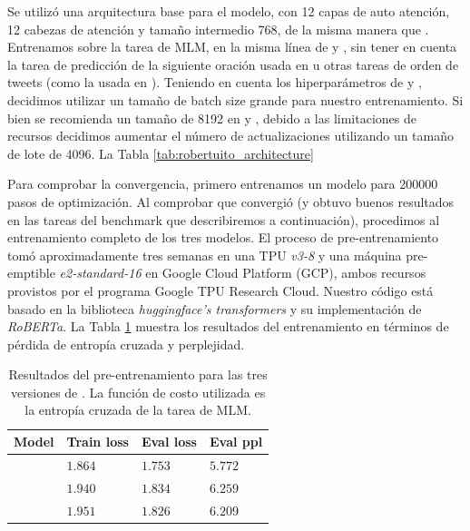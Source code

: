 Se utilizó una arquitectura \roberta{} base para el modelo, con 12 capas de auto atención, 12 cabezas de atención y tamaño intermedio 768, de la misma manera que \bertweet{}. Entrenamos \robertuito{} sobre la tarea de MLM, en la misma línea de \roberta{} y \bertweet{}, sin tener en cuenta la tarea de predicción de la siguiente oración usada en \bert{} u otras tareas de orden de tweets (como la usada en \citet{gonzalez2021twilbert}). Teniendo en cuenta los hiperparámetros de \roberta{} y \bertweet{}, decidimos utilizar un tamaño de batch size grande para nuestro entrenamiento. Si bien se recomienda un tamaño de \num{8192} en \citet{liu2019roberta} y \citet{dat2020bertweet}, debido a las limitaciones de recursos decidimos aumentar el número de actualizaciones utilizando un tamaño de lote de \num{4096}. La Tabla \ref{tab:robertuito_architecture}

Para comprobar la convergencia, primero entrenamos un modelo para \num{200000} pasos de optimización. Al comprobar que convergió (y obtuvo buenos resultados en las tareas del benchmark que describiremos a continuación), procedimos al entrenamiento completo de los tres modelos. El proceso de pre-entrenamiento tomó aproximadamente tres semanas en una TPU \emph{v3-8} y una máquina pre-emptible \emph{e2-standard-16} en Google Cloud Platform (GCP), ambos recursos provistos por el programa Google TPU Research Cloud. Nuestro código está basado en la biblioteca \emph{huggingface's transformers} \cite{wolf-etal-2020-transformers} y su implementación de \emph{RoBERTa}. La Tabla \ref{tab:training_results} muestra los resultados del entrenamiento en términos de pérdida de entropía cruzada y perplejidad.

\begin{table}[h]
    \centering
    \begin{tabular}{l l l l}
        Model   & Train loss & Eval loss   & Eval ppl \\
        \hline
        \cased{}   & $1.864$      & $1.753$       & $5.772$    \\
        \uncased{} & $1.940$      & $1.834$       & $6.259$    \\
        \deacc{}   & $1.951$      & $1.826$       & $6.209$    \\
        \hline
    \end{tabular}
    \caption{Resultados del pre-entrenamiento para las tres versiones de \robertuito{}. La función de costo utilizada es la entropía cruzada de la tarea de MLM.}
    \label{tab:training_results}
\end{table}


